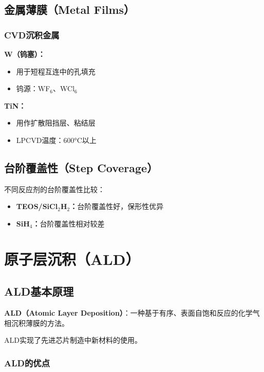 \documentclass[UTF8,12pt,a4paper]{ctexart}
\begin{document}
\subsection{金属薄膜（Metal Films）}

\subsubsection{CVD沉积金属}

\textbf{W（钨塞）：}
\begin{itemize}
    \item 用于短程互连中的孔填充
    \item 钨源：WF$_6$、WCl$_6$
\end{itemize}

\textbf{TiN：}
\begin{itemize}
    \item 用作扩散阻挡层、粘结层
    \item LPCVD温度：600°C以上
\end{itemize}

\subsection{台阶覆盖性（Step Coverage）}

不同反应剂的台阶覆盖性比较：

\begin{itemize}
    \item \textbf{TEOS/SiCl$_2$H$_2$：}台阶覆盖性好，保形性优异
    \item \textbf{SiH$_4$：}台阶覆盖性相对较差
\end{itemize}

\newpage

\section{原子层沉积（ALD）}

\subsection{ALD基本原理}

\textbf{ALD（Atomic Layer Deposition）}：一种基于有序、表面自饱和反应的化学气相沉积薄膜的方法。

ALD实现了先进芯片制造中新材料的使用。

\subsubsection{ALD的优点}
\end{document}
